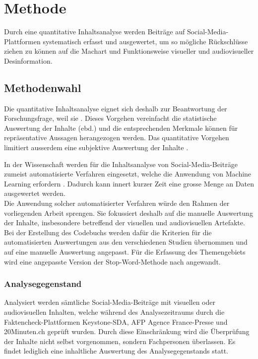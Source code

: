 \documentclass[12pt,a4paper]{article}        %
\begin{document}
\pagebreak
\section{Methode}
Durch eine quantitative Inhaltsanalyse werden Beiträge auf Social-Media-Plattformen systematisch erfasst und ausgewertet, um so mögliche Rückschlüsse ziehen zu können auf die Machart und Funktionsweise visueller und audiovisueller Desinformation.
\subsection{Methodenwahl}
Die quantitative Inhaltsanalyse eignet sich deshalb zur Beantwortung der Forschungsfrage, weil sie  \parencite[11]{oehmer-pedrazzi_standardisierte_2023}. Dieses Vorgehen vereinfacht die statistische Auswertung der Inhalte (ebd.) und die entsprechenden Merkmale können für repräsentative Aussagen herangezogen werden. Das quantitative Vorgehen limitiert ausserdem eine subjektive Auswertung der Inhalte \parencite[140]{lai_content_2015}.

In der Wissenschaft werden für die Inhaltsanalyse von Social-Media-Beiträge zumeist automatisierte Verfahren eingesetzt, welche die Anwendung von Machine Learning erfordern \parencites[vgl.\ bspw.]{andreotta_analyzing_2019}{lai_content_2015}
{schwartz_data-driven_2015}{wilson_content_2022}{wang_video_2015}. Dadurch kann innert kurzer Zeit eine grosse Menge an Daten ausgewertet werden.\\
Die Anwendung solcher automatisierter Verfahren würde den Rahmen der vorliegenden Arbeit sprengen. Sie fokussiert deshalb auf die manuelle Auswertung der Inhalte, insbesondere betreffend der visuellen und audiovisuellen Artefakte. Bei der Erstellung des Codebuchs werden dafür die Kriterien für die automatisierten Auswertungen aus den verschiedenen Studien übernommen und auf eine manuelle Auswertung angepasst. Für die Erfassung des Themengebiets wird eine angepasste Version der Stop-Word-Methode nach \textcite{schwartz_data-driven_2015} angewandt.
\subsubsection{Analysegegenstand}
Analysiert werden sämtliche Social-Media-Beiträge mit visuellen oder audiovisuellen Inhalten, welche während des Analysezeitraums durch die Faktencheck-Plattformen Keystone-SDA, AFP Agence France-Presse und 20Minuten.ch geprüft wurden. Durch diese Einschränkung wird die Überprüfung der Inhalte nicht selbst vorgenommen, sondern Fachpersonen überlassen. Es findet lediglich eine inhaltliche Auswertung des Analysegegenstands statt.
\end{document}
